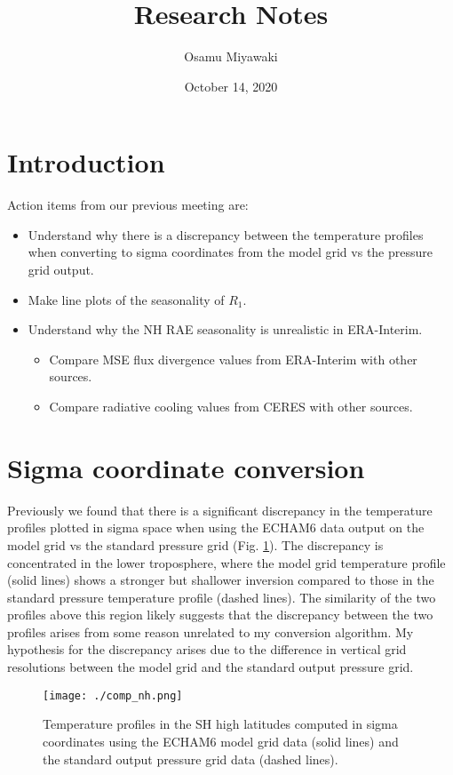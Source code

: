 \documentclass[11pt]{article}
\author{Osamu Miyawaki}
\date{October 14, 2020}
\title{Research Notes}
\begin{document}
\maketitle

\section{Introduction}
\label{sec:org17de07c}
Action items from our previous meeting are:
\begin{itemize}
\item Understand why there is a discrepancy between the temperature profiles when converting to sigma coordinates from the model grid vs the pressure grid output.
\item Make line plots of the seasonality of \(R_1\).
\item Understand why the NH RAE seasonality is unrealistic in ERA-Interim.
\begin{itemize}
\item Compare MSE flux divergence values from ERA-Interim with other sources.
\item Compare radiative cooling values from CERES with other sources.
\end{itemize}
\end{itemize}

\section{Sigma coordinate conversion}
\label{sec:org28db71d}
Previously we found that there is a significant discrepancy in the temperature profiles plotted in sigma space when using the ECHAM6 data output on the model grid vs the standard pressure grid (Fig. \ref{fig:org8f775cf}). The discrepancy is concentrated in the lower troposphere, where the model grid temperature profile (solid lines) shows a stronger but shallower inversion compared to those in the standard pressure temperature profile (dashed lines). The similarity of the two profiles above this region likely suggests that the discrepancy between the two profiles arises from some reason unrelated to my conversion algorithm. My hypothesis for the discrepancy arises due to the difference in vertical grid resolutions between the model grid and the standard output pressure grid.

\begin{figure}[htbp]
\centering
\texttt{[image: ./comp\_nh.png]}
\caption{\label{fig:org8f775cf}Temperature profiles in the SH high latitudes computed in sigma coordinates using the ECHAM6 model grid data (solid lines) and the standard output pressure grid data (dashed lines).}
\end{figure}
\end{document}
